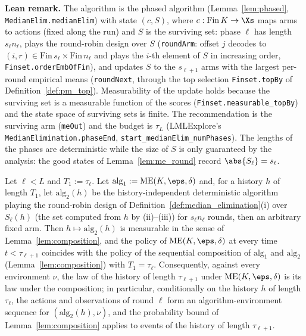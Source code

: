 \textbf{Lean remark.} The algorithm is the phased algorithm (Lemma~\ref{lem:phased},
\texttt{MedianElim.medianElim}) with state $(c, S)$, where $c : \mathrm{Fin}\,K \to \Xs$ maps
arms to actions (fixed along the run) and $S$ is the surviving set: phase $\ell$ has length
$s_\ell n_\ell$, plays the round-robin design over $S$ (\texttt{roundArm}: offset $j$ decodes to
$(i, r) \in \mathrm{Fin}\,s_\ell \times \mathrm{Fin}\,n_\ell$ and plays the $i$-th element of
$S$ in increasing order, \texttt{Finset.orderEmbOfFin}), and updates $S$ to the $s_{\ell+1}$ arms
with the largest per-round empirical means (\texttt{roundNext}, through the top selection
\texttt{Finset.topBy} of Definition~\ref{def:pm_top}). Measurability of the update holds because
the surviving set is a measurable function of the scores (\texttt{Finset.measurable\_topBy}) and
the state space of surviving sets is finite. The recommendation is the surviving arm
(\texttt{meOut}) and the budget is $\tau_L$ (LMLExplore's \texttt{MedianElimination.phaseEnd},
\texttt{start\_medianElim\_numPhases}).
The lengths of the phases are deterministic while the size of $S$ is only guaranteed by the
analysis: the good states of Lemma~\ref{lem:me_round} record $\abs{S_\ell} = s_\ell$.

\begin{lemma}
\label{lem:pm_policy_composition}
\leanok
{}
Let $\ell<L$ and $T_1 := \tau_\ell$. Let $\mathrm{alg}_1 := \mathrm{ME}(K,\eps,\delta)$ and, for a
history $h$ of length $T_1$, let $\mathrm{alg}_2(h)$ be the history-independent deterministic
algorithm playing the round-robin design of Definition~\ref{def:median_elimination}(i) over
$S_\ell(h)$ (the set computed from $h$ by (ii)--(iii)) for $s_\ell n_\ell$ rounds, then an
arbitrary fixed arm. Then $h\mapsto\mathrm{alg}_2(h)$ is measurable in the sense of
Lemma~\ref{lem:composition}, and the policy of $\mathrm{ME}(K,\eps,\delta)$ at every time
$t<\tau_{\ell+1}$ coincides with the policy of the sequential composition of $\mathrm{alg}_1$ and
$\mathrm{alg}_2$ (Lemma~\ref{lem:composition}) with $T_1 = \tau_\ell$. Consequently, against
every environment $\nu$, the law of the history of length $\tau_{\ell+1}$ under
$\mathrm{ME}(K,\eps,\delta)$ is its law under the composition; in particular, conditionally
on the history $h$ of length $\tau_\ell$, the actions and observations of round $\ell$ form an
algorithm-environment sequence for $(\mathrm{alg}_2(h),\nu)$, and the probability bound of
Lemma~\ref{lem:composition} applies to events of the history of length $\tau_{\ell+1}$.
\end{lemma}

